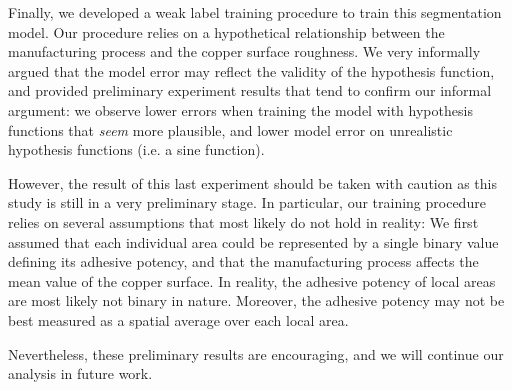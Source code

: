 \documentclass[10pt,twocolumn,letterpaper]{article}
\begin{document}
Finally, we developed a weak label training procedure to train this segmentation model.
Our procedure relies on a hypothetical relationship between the manufacturing process and the
copper surface roughness.
We very informally argued that the model error may reflect the validity of the hypothesis function,
and provided preliminary experiment results that tend to confirm our informal argument:
we observe lower errors when training the model with hypothesis functions that \textit{seem} more plausible,
and lower model error on unrealistic hypothesis functions (i.e. a sine function).

However, the result of this last experiment should be taken with caution as this study is still in a very preliminary stage.
In particular, our training procedure relies on several assumptions that most likely do not hold in reality: 
We first assumed that each individual area could be represented by a single binary value defining its adhesive potency,
and that the manufacturing process affects the mean value of the copper surface.
In reality, the adhesive potency of local areas are most likely not binary in nature.
Moreover, the adhesive potency may not be best measured as a spatial average over each local area.

Nevertheless, these preliminary results are encouraging, and we will continue our analysis in future work.

{\small
	
	
}
\end{document}
